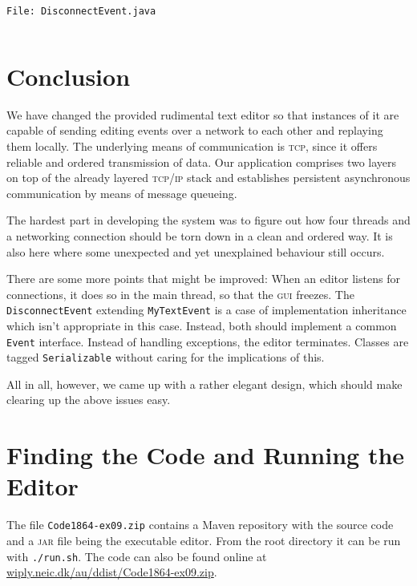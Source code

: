 \documentclass[a4paper,draft,12pt,oneside,article,table]{memoir}
\newcommand{\srcpath}{../ex09/src/main/java/ddist}
\newcommand{\inmnt}[3]{\vspace{1em}\noindent\texttt{\color{gray}File: #3}\vspace{-1em}\inputminted[tabsize=4,firstline=#1,firstnumber=#1,lastline=#2,linenos]{java}{\srcpath/#3}}
\newcommand{\mil}[1]{\texttt{#1}}
\begin{document}
\inmnt{1}{1000}{DisconnectEvent.java}


\chapter{Conclusion}

We have changed the provided rudimental text editor so that instances of
it are capable of sending editing events over a network to each other
and replaying them locally. The underlying means of communication is
\textsc{tcp}, since it offers reliable and ordered transmission of data. Our
application comprises two layers on top of the already layered \textsc{tcp/ip}
stack and establishes persistent asynchronous communication by means of
message queueing.

The hardest part in developing the system was to figure out how four
threads and a networking connection should be torn down in a clean and
ordered way. It is also here where some unexpected and yet unexplained
behaviour still occurs.

There are some more points that might be improved: When an editor
listens for connections, it does so in the main thread, so that the
\textsc{gui} freezes. The \mil{DisconnectEvent} extending
\mil{MyTextEvent} is a case of implementation inheritance which isn't
appropriate in this case. Instead, both should implement a common
\mil{Event} interface. Instead of handling exceptions, the editor
terminates. Classes are tagged \mil{Serializable} without caring for the
implications of this.

All in all, however, we came up with a rather elegant design, which
should make clearing up the above issues easy.

\appendix

\chapter{Finding the Code and Running the Editor}

The file \texttt{Code1864-ex09.zip} contains a Maven repository with the source
code and a \textsc{jar} file being the executable editor. From the
root directory it can be run with \texttt{./run.sh}. The code can also
be found online at \url{wiply.neic.dk/au/ddist/Code1864-ex09.zip}.

\end{document}
